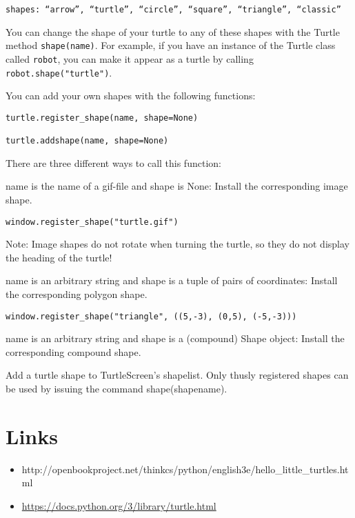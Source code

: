 \begin{verbatim}
shapes: “arrow”, “turtle”, “circle”, “square”, “triangle”, “classic”
\end{verbatim}

You can change the shape of your turtle to any of these shapes with the
Turtle method \texttt{shape(name)}. For example, if you have an instance
of the Turtle class called \texttt{robot}, you can make it appear as a
turtle by calling \texttt{robot.shape("turtle")}.

You can add your own shapes with the following functions:

\begin{verbatim}
turtle.register_shape(name, shape=None)

turtle.addshape(name, shape=None)
\end{verbatim}

There are three different ways to call this function:

name is the name of a gif-file and shape is None: Install the
corresponding image shape.

\begin{verbatim}
window.register_shape("turtle.gif")
\end{verbatim}

Note: Image shapes do not rotate when turning the turtle, so they do not
display the heading of the turtle!

name is an arbitrary string and shape is a tuple of pairs of
coordinates: Install the corresponding polygon shape.

\begin{verbatim}
window.register_shape("triangle", ((5,-3), (0,5), (-5,-3)))
\end{verbatim}

name is an arbitrary string and shape is a (compound) Shape object:
Install the corresponding compound shape.

Add a turtle shape to TurtleScreen's shapelist. Only thusly registered
shapes can be used by issuing the command shape(shapename).

\section{Links}\label{links}

\begin{itemize}
\tightlist
\item
  http://openbookproject.net/thinkcs/python/english3e/hello\_little\_turtles.html
\item
  \url{https://docs.python.org/3/library/turtle.html}
\end{itemize}

